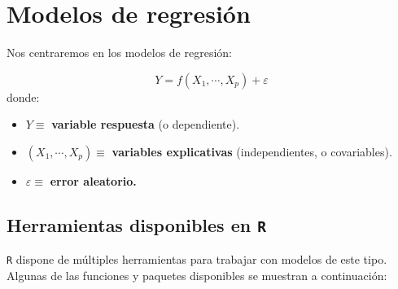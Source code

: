 \documentclass[]{book}
\begin{document}
\section{Modelos de regresión}\label{modelos-de-regresion}

Nos centraremos en los modelos de regresión:

\[Y=f(X_{1},\cdots,X_{p})+\varepsilon\] donde:

\begin{itemize}
\item
  \(Y\equiv\) \textbf{variable respuesta} (o dependiente).
\item
  \(\left( X_{1},\cdots,X_{p}\right) \equiv\) \textbf{variables
  explicativas} (independientes, o covariables).
\item
  \(\varepsilon\equiv\) \textbf{error aleatorio.}
\end{itemize}

\subsection{\texorpdfstring{Herramientas disponibles en
\texttt{R}}{Herramientas disponibles en R}}\label{herramientas-disponibles-en-r}

\texttt{R} dispone de múltiples herramientas para trabajar con modelos
de este tipo. Algunas de las funciones y paquetes disponibles se
muestran a continuación:
\end{document}
